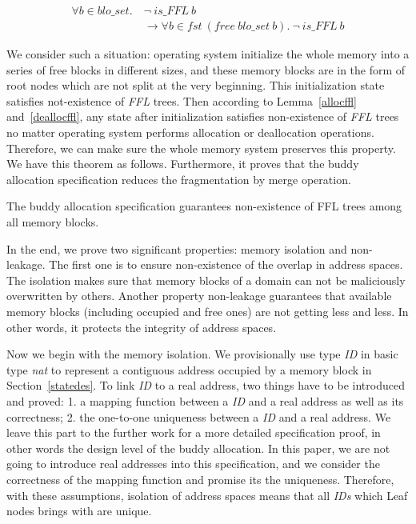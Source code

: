\begin{lemma} 
\label{deallocffl}
\end{lemma}
\vspace{-7pt}
{\footnotesize
\begin{align*}
\forall b \in blo\_set.\ &\neg\ is\_FFL\ b \\
&\longrightarrow \forall b \in fst\ (free\ blo\_set\ b).\ \neg\ is\_FFL\ b
\end{align*}
}
\vspace{-12pt}

We consider such a situation: operating system initialize the whole memory into a series of free blocks in different sizes, and these memory blocks are in the form of root nodes which are not split at the very beginning. This initialization state satisfies not-existence of \emph{FFL} trees. Then according to Lemma~\ref{allocffl} and~\ref{deallocffl}, any state after initialization satisfies non-existence of \emph{FFL} trees no matter operating system performs allocation or deallocation operations. Therefore, we can make sure the whole memory system preserves this property. We have this theorem as follows. Furthermore, it proves that the buddy allocation specification reduces the fragmentation by merge operation.

\begin{theorem}
The buddy allocation specification guarantees non-existence of FFL trees among all memory blocks.
\end{theorem}

In the end, we prove two significant properties: memory isolation and non-leakage. The first one is to ensure non-existence of the overlap in address spaces. The isolation makes sure that memory blocks of a domain can not be maliciously overwritten by others. Another property non-leakage guarantees that available memory blocks (including occupied and free ones) are not getting less and less. In other words, it protects the integrity of address spaces.

Now we begin with the memory isolation. We provisionally use type \emph{ID} in basic type \emph{nat} to represent a contiguous address occupied by a memory block in Section~\ref{statedes}. To link \emph{ID} to a real address, two things have to be introduced and proved: 1. a mapping function between a \emph{ID} and a real address as well as its correctness; 2. the one-to-one uniqueness between a \emph{ID} and a real address. We leave this part to the further work for a more detailed specification proof, in other words the design level of the buddy allocation. In this paper, we are not going to introduce real addresses into this specification, and we consider the correctness of the mapping function and promise its the uniqueness. Therefore, with these assumptions, isolation of address spaces means that all \emph{IDs} which Leaf nodes brings with are unique.


